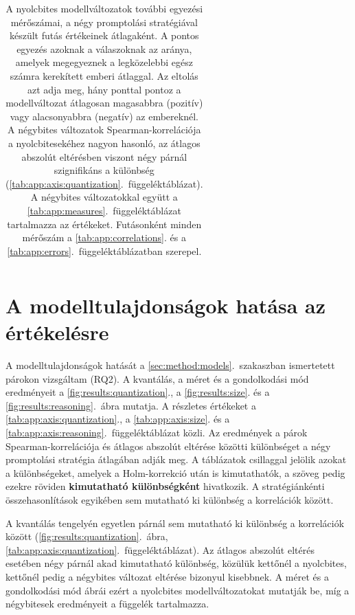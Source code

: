 \documentclass[
]{elteikthesis}[2024/04/26]
\begin{document}
\begin{table}[htbp]
{\begin{tabular}{ | l | c | c | r | r | r | r | r | r | r | }
		\hline
	\end{tabular}}
	\caption[A modellváltozatok további mérőszámai]{A nyolcbites modellváltozatok további egyezési
	mérőszámai, a négy promptolási stratégiával készült futás értékeinek átlagaként.
	A pontos egyezés azoknak a válaszoknak az aránya, amelyek megegyeznek a legközelebbi egész számra
	kerekített emberi átlaggal. Az eltolás azt adja meg, hány ponttal pontoz a modellváltozat átlagosan
	magasabbra (pozitív) vagy alacsonyabbra (negatív) az embereknél.
	A négybites változatok Spearman-korrelációja a nyolcbitesekéhez nagyon hasonló, az átlagos abszolút
	eltérésben viszont négy párnál szignifikáns a különbség (\ref{tab:app:axis:quantization}.~függeléktáblázat).
	A négybites változatokkal együtt a \ref{tab:app:measures}.~függeléktáblázat tartalmazza az értékeket.
	Futásonként minden mérőszám a \ref{tab:app:correlations}. és a \ref{tab:app:errors}.~függeléktáblázatban
	szerepel.}
	\label{tab:results:measures}
\end{table}

\section{A modelltulajdonságok hatása az értékelésre}
\label{sec:results:axes}

A modelltulajdonságok hatását a \ref{sec:method:models}.~szakaszban ismertetett párokon vizsgáltam (RQ2).
A kvantálás, a méret és a gondolkodási mód eredményeit a \ref{fig:results:quantization}., a \ref{fig:results:size}. és a \ref{fig:results:reasoning}.~ábra mutatja.
A részletes értékeket a \ref{tab:app:axis:quantization}., a \ref{tab:app:axis:size}. és a \ref{tab:app:axis:reasoning}.~függeléktáblázat közli.
Az eredmények a párok Spearman-korrelációja és
átlagos abszolút eltérése közötti különbséget a négy promptolási stratégia átlagában adják meg.
A táblázatok csillaggal jelölik azokat a különbségeket, amelyek a Holm-korrekció után is kimutathatók,
a szöveg pedig ezekre röviden \textbf{kimutatható különbségként} hivatkozik.
A stratégiánkénti összehasonlítások egyikében sem mutatható ki különbség a korrelációk között.

A kvantálás tengelyén egyetlen párnál sem mutatható ki különbség a korrelációk között
(\ref{fig:results:quantization}.~ábra, \ref{tab:app:axis:quantization}.~függeléktáblázat).
Az átlagos abszolút eltérés esetében négy párnál akad kimutatható különbség,
közülük kettőnél a nyolcbites, kettőnél pedig a négybites változat eltérése bizonyul kisebbnek.
A méret és a gondolkodási mód ábrái ezért a nyolcbites modellváltozatokat mutatják be,
míg a négybitesek eredményeit a függelék tartalmazza.
\end{document}
